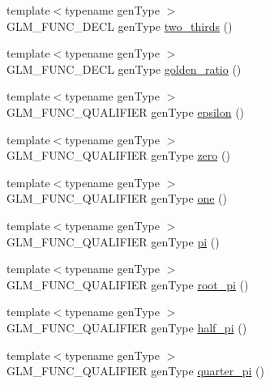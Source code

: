 \begin{DoxyCompactItemize}
\item 
{\footnotesize template$<$typename gen\-Type $>$ }\\G\-L\-M\-\_\-\-F\-U\-N\-C\-\_\-\-D\-E\-C\-L gen\-Type \hyperlink{group__gtc__constants_gadde7f2efce3b14c8b26944fbafed4a10}{two\-\_\-thirds} ()
\item 
{\footnotesize template$<$typename gen\-Type $>$ }\\G\-L\-M\-\_\-\-F\-U\-N\-C\-\_\-\-D\-E\-C\-L gen\-Type \hyperlink{group__gtc__constants_gafd53093ef2d756333865d774bea3cdf9}{golden\-\_\-ratio} ()
\item 
{\footnotesize template$<$typename gen\-Type $>$ }\\G\-L\-M\-\_\-\-F\-U\-N\-C\-\_\-\-Q\-U\-A\-L\-I\-F\-I\-E\-R gen\-Type \hyperlink{group__gtc__constants_gacb41049b8d22c8aa90e362b96c524feb}{epsilon} ()
\item 
{\footnotesize template$<$typename gen\-Type $>$ }\\G\-L\-M\-\_\-\-F\-U\-N\-C\-\_\-\-Q\-U\-A\-L\-I\-F\-I\-E\-R gen\-Type \hyperlink{group__gtc__constants_ga5cc97dd01d37fc199264ff6030578435}{zero} ()
\item 
{\footnotesize template$<$typename gen\-Type $>$ }\\G\-L\-M\-\_\-\-F\-U\-N\-C\-\_\-\-Q\-U\-A\-L\-I\-F\-I\-E\-R gen\-Type \hyperlink{group__gtc__constants_ga8186ec2c330457d41d9686c47cd3b2d1}{one} ()
\item 
{\footnotesize template$<$typename gen\-Type $>$ }\\G\-L\-M\-\_\-\-F\-U\-N\-C\-\_\-\-Q\-U\-A\-L\-I\-F\-I\-E\-R gen\-Type \hyperlink{group__gtc__constants_gae671930537266a9a650ccb4b88757692}{pi} ()
\item 
{\footnotesize template$<$typename gen\-Type $>$ }\\G\-L\-M\-\_\-\-F\-U\-N\-C\-\_\-\-Q\-U\-A\-L\-I\-F\-I\-E\-R gen\-Type \hyperlink{group__gtc__constants_ga1cfeb345f34f72697d14f4db8d5d4c6c}{root\-\_\-pi} ()
\item 
{\footnotesize template$<$typename gen\-Type $>$ }\\G\-L\-M\-\_\-\-F\-U\-N\-C\-\_\-\-Q\-U\-A\-L\-I\-F\-I\-E\-R gen\-Type \hyperlink{group__gtc__constants_ga7f7a1050729f3b03b1873a06ba4a472f}{half\-\_\-pi} ()
\item 
{\footnotesize template$<$typename gen\-Type $>$ }\\G\-L\-M\-\_\-\-F\-U\-N\-C\-\_\-\-Q\-U\-A\-L\-I\-F\-I\-E\-R gen\-Type \hyperlink{group__gtc__constants_ga0148d757b4bfda4d86251b8d1ea1dad3}{quarter\-\_\-pi} ()
\item 

\end{DoxyCompactItemize}
